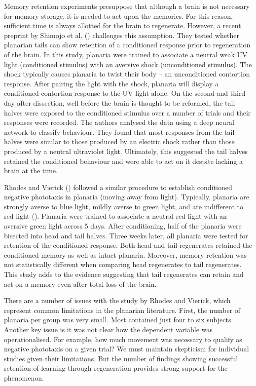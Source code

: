 \documentclass[
  jou,
  floatsintext,
  longtable,
  nolmodern,
  notxfonts,
  notimes,
  donotrepeattitle,
  colorlinks=true,linkcolor=blue,citecolor=blue,urlcolor=blue]{apa7}
\begin{document}
Memory retention experiments presuppose that although a brain is not
necessary for memory storage, it is needed to act upon the memories. For
this reason, sufficient time is always allotted for the brain to
regenerate. However, a recent preprint by Shimojo et al.
() challenges this
assumption. They tested whether planarian tails can show retention of a
conditioned response prior to regeneration of the brain. In this study,
planaria were trained to associate a neutral weak UV light (conditioned
stimulus) with an aversive shock (unconditioned stimulus). The shock
typically causes planaria to twist their body -- an unconditioned
contortion response. After pairing the light with the shock, planaria
will display a conditioned contortion response to the UV light alone. On
the second and third day after dissection, well before the brain is
thought to be reformed, the tail halves were exposed to the conditioned
stimulus over a number of trials and their responses were recorded. The
authors analysed the data using a deep neural network to classify
behaviour. They found that most responses from the tail halves were
similar to those produced by an electric shock rather than those
produced by a neutral ultraviolet light. Ultimately, this suggested the
tail halves retained the conditioned behaviour and were able to act on
it despite lacking a brain at the time.

Rhodes and Vierick () followed a
similar procedure to establish conditioned negative phototaxis in
planaria (moving away from light). Typically, planaria are strongly
averse to blue light, mildly averse to green light, and are indifferent
to red light (). Planaria were trained to associate a neutral red light with an
aversive green light across 5 days. After conditioning, half of the
planaria were bisected into head and tail halves. Three weeks later, all
planaria were tested for retention of the conditioned response. Both
head and tail regenerates retained the conditioned memory as well as
intact planaria. Moreover, memory retention was not statistically
different when comparing head regenerates to tail regenerates. This
study adds to the evidence suggesting that tail regenerates can retain
and act on a memory even after total loss of the brain.

There are a number of issues with the study by Rhodes and Vierick, which
represent common limitations in the planarian literature. First, the
number of planaria per group was very small. Most contained just four to
six subjects. Another key issue is it was not clear how the dependent
variable was operationalised. For example, how much movement was
necessary to qualify as negative phototaxis on a given trial? We must
maintain skepticism for individual studies given their limitations. But
the number of findings showing successful retention of learning through
regeneration provides strong support for the phenomenon.
\end{document}
